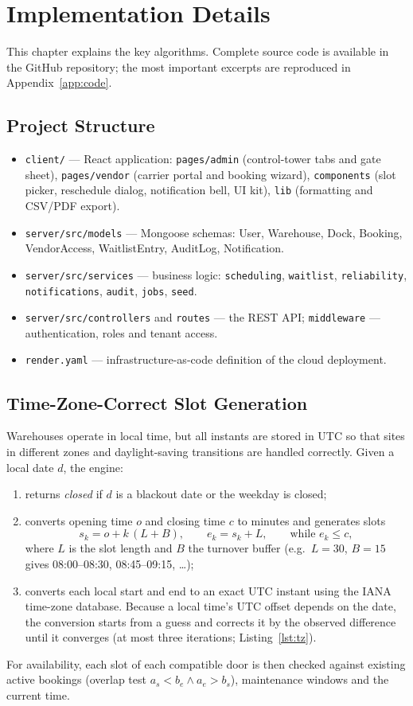 \chapter{Implementation Details}\label{ch:impl}
This chapter explains the key algorithms. Complete source code is available in the GitHub repository; the most important excerpts are reproduced in Appendix~\ref{app:code}.

\section{Project Structure}
\begin{itemize}
  \item \texttt{client/} --- React application: \texttt{pages/admin} (control-tower tabs and gate sheet), \texttt{pages/vendor} (carrier portal and booking wizard), \texttt{components} (slot picker, reschedule dialog, notification bell, UI kit), \texttt{lib} (formatting and CSV/PDF export).
  \item \texttt{server/src/models} --- Mongoose schemas: User, Warehouse, Dock, Booking, VendorAccess, WaitlistEntry, AuditLog, Notification.
  \item \texttt{server/src/services} --- business logic: \texttt{scheduling}, \texttt{waitlist}, \texttt{reliability}, \texttt{notifications}, \texttt{audit}, \texttt{jobs}, \texttt{seed}.
  \item \texttt{server/src/controllers} and \texttt{routes} --- the REST API; \texttt{middleware} --- authentication, roles and tenant access.
  \item \texttt{render.yaml} --- infrastructure-as-code definition of the cloud deployment.
\end{itemize}

\section{Time-Zone-Correct Slot Generation}
Warehouses operate in local time, but all instants are stored in UTC so that sites in different zones and daylight-saving transitions are handled correctly. Given a local date $d$, the engine:
\begin{enumerate}
  \item returns \emph{closed} if $d$ is a blackout date or the weekday is closed;
  \item converts opening time $o$ and closing time $c$ to minutes and generates slots
  \[ s_k = o + k\,(L + B), \qquad e_k = s_k + L, \qquad \text{while } e_k \le c, \]
  where $L$ is the slot length and $B$ the turnover buffer (e.g.\ $L=30$, $B=15$ gives 08:00--08:30, 08:45--09:15, \ldots);
  \item converts each local start and end to an exact UTC instant using the IANA time-zone database. Because a local time's UTC offset depends on the date, the conversion starts from a guess and corrects it by the observed difference until it converges (at most three iterations; Listing~\ref{lst:tz}).
\end{enumerate}
For availability, each slot of each compatible door is then checked against existing active bookings (overlap test $a_s < b_e \wedge a_e > b_s$), maintenance windows and the current time.

